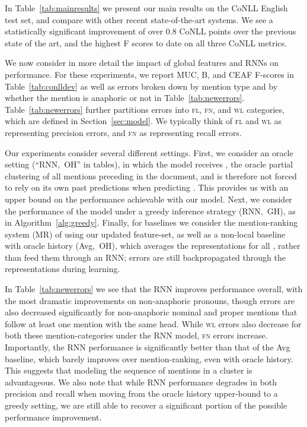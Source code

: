 \documentclass[11pt,letterpaper]{article}
\begin{document}
In Table~\ref{tab:mainresults} we present our main results on the CoNLL English test set, and compare with other recent state-of-the-art systems. We see a statistically significant improvement of over 0.8 CoNLL points over the previous state of the art, and the highest F scores to date on all three CoNLL metrics. 

We now consider in more detail the impact of global features and RNNs on performance. For these experiments, we report MUC, B, and CEAF F-scores in Table~\ref{tab:conlldev} as well as errors broken down by mention type and by whether the mention is anaphoric or not in Table~\ref{tab:newerrors}. Table~\ref{tab:newerrors} further partitions errors into \textsc{fl}, \textsc{fn}, and \textsc{wl} categories, which are defined in Section~\ref{sec:model}. We typically think of \textsc{fl} and \textsc{wl} as representing precision errors, and \textsc{fn} as representing recall errors.
 
Our experiments consider several different settings. First, we consider an oracle setting (``RNN,~OH'' in tables), in which the model receives , the oracle partial clustering of all mentions preceding  in
the document, and is therefore not forced to rely on its own past predictions when predicting . 
This provides us with an upper bound on the performance achievable with our model. Next, we consider the performance of the model under a greedy inference strategy (RNN,~GH), as in
Algorithm~\ref{alg:greedy}. 
Finally, for baselines we consider the mention-ranking system (MR) of  using our updated feature-set, as well as a non-local baseline with oracle history (Avg,~OH), which averages the representations  for all , rather than feed them through an RNN; errors are still backpropagated through the  representations during learning.

In Table~\ref{tab:newerrors} we see that the RNN improves performance overall, with the most dramatic improvements on non-anaphoric pronouns, though errors are also decreased significantly for non-anaphoric nominal and proper mentions that follow at least one mention with the same head.
While \textsc{wl} errors also decrease for both these mention-categories under the RNN model, \textsc{fn} errors increase. Importantly, the RNN performance is significantly better than that of the Avg baseline, which barely improves over mention-ranking, even with oracle history. This suggests that modeling the sequence of mentions in a cluster is advantageous. We also note that while RNN performance degrades in both precision and recall when moving from the oracle history upper-bound to a greedy setting, we are still able to recover a significant portion of the possible performance improvement. 
\end{document}
